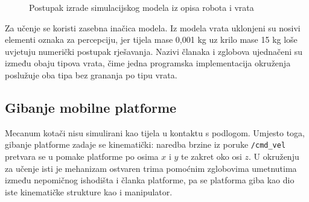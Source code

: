 \begin{figure}[H]
    \caption{Postupak izrade simulacijskog modela iz opisa robota i vrata}
    \label{fig:urdf-usd-pipeline}
\end{figure}

Za učenje se koristi zasebna inačica modela. Iz modela vrata uklonjeni su nosivi elementi
oznaka za percepciju, jer tijela mase 0,001 kg uz krilo mase 15 kg loše uvjetuju numerički
postupak rješavanja. Nazivi članaka i zglobova ujednačeni su između obaju tipova vrata, čime
jedna programska implementacija okruženja poslužuje oba tipa bez grananja po tipu vrata.

\subsection{Gibanje mobilne platforme}
\label{sec:baza-model}

Mecanum kotači nisu simulirani kao tijela u kontaktu s podlogom. Umjesto toga, gibanje
platforme zadaje se kinematički: naredba brzine iz poruke \texttt{/cmd\_vel} pretvara se u
pomake platforme po osima $x$ i $y$ te zakret oko osi $z$. U okruženju za učenje isti je
mehanizam ostvaren trima pomoćnim zglobovima umetnutima između nepomičnog ishodišta i članka
platforme, pa se platforma giba kao dio iste kinematičke strukture kao i manipulator.

